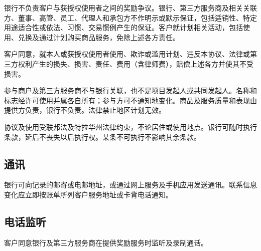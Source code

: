 \documentclass[UTF8,fontset=none,11pt,a4paper]{ctexart}
\begin{document}
银行不负责客户与获授权使用者之间的奖励争议。银行、第三方服务商及相关关联方、董事、高管、员工、代理人和承包方不作明示或默示保证，包括适销性、特定用途适合性或依法、习惯、交易惯例产生的保证。客户就计划相关活动，包括使用、兑换及通过计划购买商品服务，免除上述\allowbreak\mbox{各方责任。}


客户同意，就本人或获授权使用者使用、欺诈或滥用计划、违反本协议、法律或第三方权利产生的损失、损害、责任、费用（含律师费），赔偿上述各方并使其\allowbreak\mbox{不受损害。}


参与商户及第三方服务商不与银行关联，也不是项目发起人或共同发起人。名称和标志经许可使用并属各自所有；参与方可不通知地变化。商品及服务质量和表现由提供方负责，银行不负责。法律禁止地区\allowbreak\mbox{计划无效。}


协议及使用受联邦法及特拉华州法律约束，不论居住或使用地点。银行可随时执行条款，延后不丧失以后执行权。某条不可执行不影响\allowbreak\mbox{其余条款。}


\subsection*{通讯}
银行可向记录的邮寄或电邮地址，或通过网上服务及手机应用发送通讯。联系信息变化应立即按账单所列客户服务地址或卡背\allowbreak\mbox{电话通知。}


\subsection*{电话监听}
客户同意银行及第三方服务商在提供奖励服务时监听及\allowbreak\mbox{录制通话。}
\end{document}
